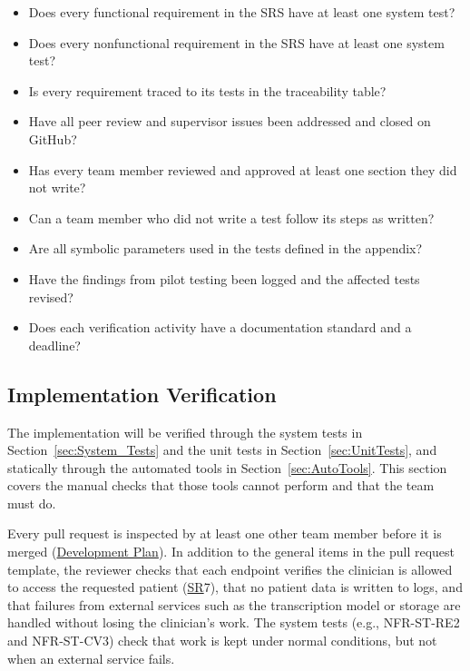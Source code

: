 \documentclass[12pt, titlepage]{article}
\newcommand{\DevPlanLink}{\href{https://github.com/Nour-Fawaz/MacaBoca/blob/main/pdfs/DevelopmentPlan/DevelopmentPlan.pdf}{Development Plan}}
\newcommand{\srssr}[1]{\href{https://github.com/Nour-Fawaz/MacaBoca/blob/main/pdfs/SRS/SRS.pdf}{SR}}
\renewcommand{\_}{\oldunderscore\allowbreak}
\begin{document}
\begin{itemize}[label=]
  \item Does every functional requirement in the SRS have at least one system test?
  \item Does every nonfunctional requirement in the SRS have at least one system test?
  \item Is every requirement traced to its tests in the traceability table?
  \item Have all peer review and supervisor issues been addressed and closed on GitHub?
  \item Has every team member reviewed and approved at least one section they did not write?
  \item Can a team member who did not write a test follow its steps as written?
  \item Are all symbolic parameters used in the tests defined in the appendix?
  \item Have the findings from pilot testing been logged and the affected tests revised?
  \item Does each verification activity have a documentation standard and a deadline?
\end{itemize}

\subsection{Implementation Verification}

The implementation will be verified through the system tests in Section~\ref{sec:System_Tests} and the unit tests in Section~\ref{sec:UnitTests}, and statically through the automated tools in Section~\ref{sec:AutoTools}. 
This section covers the manual checks that those tools cannot perform and that the team must do.

Every pull request is inspected by at least one other team member before it is merged (\DevPlanLink). 
In addition to the general items in the pull request template, the reviewer checks that each endpoint verifies the clinician is allowed to access the requested patient (\srssr*{7}), that no patient data is written to logs, and that failures from external services such as the transcription model or storage are handled without losing the clinician's work. The system tests (e.g., NFR-ST-RE2 and NFR-ST-CV3) check that work is kept under normal conditions, but not when an external service fails.
\end{document}
